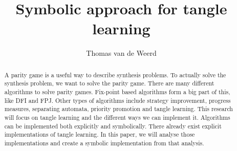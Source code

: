 \documentclass[acmtog, authorversion]{acmart}
\begin{document}
\title{Symbolic approach for tangle learning}


\author{Thomas van de Weerd}



\renewcommand{\shortauthors}{Author}

\begin{abstract}
  A parity game is a useful way to describe synthesis problems. To actually solve the synthesis problem, we want to solve the parity game.
There are many different algorithms to solve parity games. Fix-point based algorithms form a big part of this, like DFI and FPJ. 
Other types of algorithms include strategy improvement, progress measures, separating automata, priority promotion and tangle learning.
This research will focus on tangle learning and the different ways we can implement it. 
Algorithms can be implemented both explicitly and symbolically. 
There already exist explicit implementations of tangle learning. In this paper, we will analyse those implementations and create a symbolic implementation from that analysis.

\end{abstract}

\end{document}
